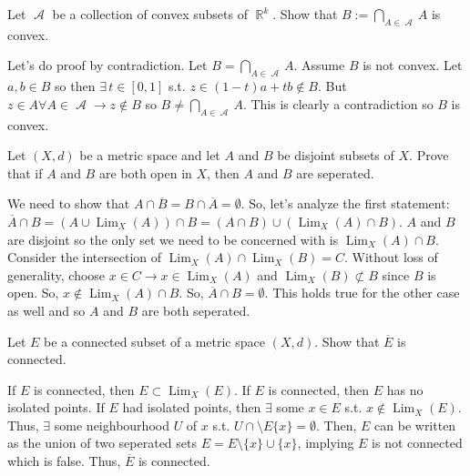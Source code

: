 \documentclass[12pt,letterpaper,boxed]{hmcpset}
\DeclareMathOperator{\Lim}{Lim}
\DeclareMathOperator{\A}{\mathcal{A}}
\DeclareMathOperator{\R}{\mathbb{R}}
\begin{document}
\begin{problem}[Exercise 5.3]
Let $\A$ be a collection of convex subsets of $\R^{k}.$ Show that $B := \bigcap_{A \in \A} A$ is convex. 
\end{problem}

\begin{solution}
Let's do proof by contradiction. Let $B=\bigcap_{A \in \A} A$. Assume $B$ is not convex. Let $a, b \in B$ so then $\exists \, t\in [0, 1]$ s.t. $z \in (1 - t)a + tb \notin B$. But $z \in A \forall A \in \A \rightarrow z \notin B$ so $B \neq \bigcap_{A \in \A} A.$ This is clearly a contradiction so $B$ is convex.
\end{solution}

\begin{problem}[Exercise 5.7]
Let $(X, d)$ be a metric space and let $A$ and $B$ be disjoint subsets of $X$. Prove that if $A$ and $B$ are both open in $X$, then $A$ and $B$ are seperated.
\end{problem}

\begin{solution}
We need to show that $A \cap \overline{B} = B \cap \overline{A} = \emptyset.$ So, let's analyze the first statement: $\overline{A}\cap B = (A \cup \Lim_{X}(A))\cap B = (A \cap B)\cup(\Lim_{X}(A) \cap B).$ $A$ and $B$ are disjoint so the only set we need to be concerned with is $\Lim_{X}(A) \cap B$. Consider the intersection of $\Lim_X(A)\cap \Lim_X(B) = C.$ Without loss of generality, choose $x \in C \rightarrow x \in \Lim_X(A)$ and $\Lim_X(B)\not \subset B$ since $B$ is open. So, $x \notin \Lim_X(A)\cap B.$ So, $\overline{A}\cap B = \emptyset$. This holds true for the other case as well and so $A$ and $B$ are both seperated.  
\end{solution}

\begin{problem}[Exercise 5.8]
Let $E$ be a connected subset of a metric space $(X, d)$. Show that $\overline{E}$ is connected.
\end{problem}

\begin{solution}
If $E$ is connected, then $E \subset \Lim_X (E)$. If $E$ is connected, then $E$ has no isolated points. If $E$ had isolated points, then $\exists$ some $x\in E$ s.t. $x \notin \Lim_X (E)$. Thus, $\exists$ some neighbourhood $U$ of $x$ s.t. $U\cap\setminus E\{x\} = \emptyset.$ Then, $E$ can be written as the union of two seperated sets $E = E\setminus \{x\}\cup \{x\}$, implying $E$ is not connected which is false. Thus, $\overline{E}$ is connected. 
\end{solution}
\end{document}
